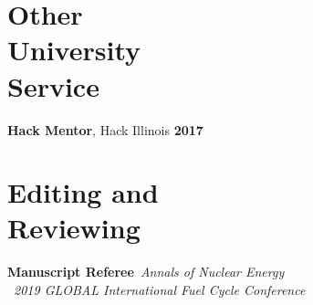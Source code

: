 \documentclass[margin,line]{resume}
\begin{document}
\begin{resume}
    \section{\mysidestyle Other\\University\\Service}
		\textbf{Hack Mentor}, Hack Illinois \hfill \textbf{2017}\vspace{.5mm}\\%

\section{\mysidestyle Editing and\\Reviewing}
    \textbf{Manuscript Referee}~\hfill \emph{Annals of Nuclear Energy}\\%
						\mbox{}~\hfill \emph{2019 GLOBAL International Fuel 
    Cycle Conference}\\%


\end{resume}
\end{document}
